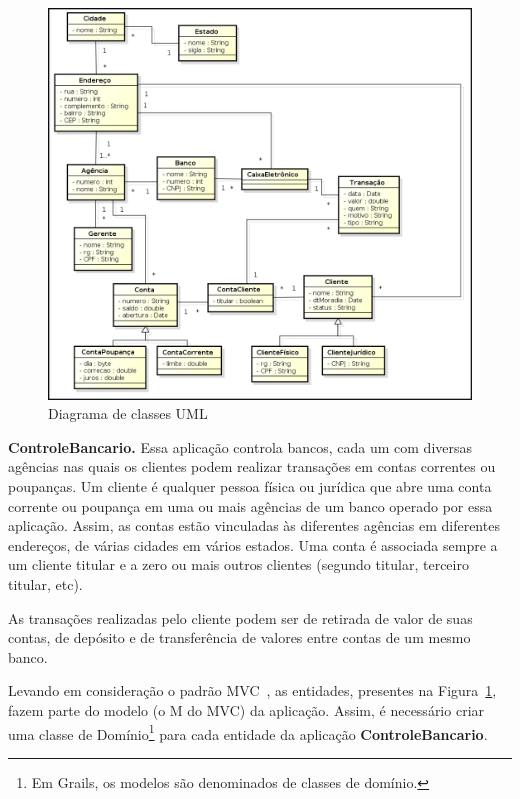 \begin{figure}[h]
\centering
\includegraphics[width=14cm]{fig/ControleBancario}
\caption{Diagrama de classes UML}
\label{figUML}
\end{figure}

\vspace{0.5cm}

\begin{cBox}
{\bf  ControleBancario.} Essa aplicação  controla bancos,  cada um  com diversas
agências nas quais os clientes  podem realizar transações em contas correntes ou
poupanças. Um  cliente é qualquer pessoa  física ou jurídica que  abre uma conta
corrente  ou poupança  em uma  ou mais  agências de  um banco  operado  por essa
aplicação. Assim,  as  contas   estão  vinculadas  às  diferentes  agências  em
diferentes  endereços,  de  várias  cidades  em vários  estados.   Uma  conta  é
associada sempre a um cliente titular  e a zero ou mais outros clientes (segundo
titular, terceiro titular, etc). 

As transações  realizadas pelo cliente  podem ser de  retirada de valor  de suas
contas, de depósito e de transferência de valores entre contas de um mesmo banco.
\end{cBox}

Levando  em consideração o  padrão MVC~\cite{KP88},  as entidades,  presentes na
Figura~\ref{figUML}, fazem parte do modelo (o  M do MVC) da aplicação.  Assim, é
necessário  criar  uma classe  de  Domínio\footnote{Em  Grails,  os modelos  são
  denominados  de classes  de domínio.}   para cada  entidade da  aplicação {\bf
  ControleBancario}.  

